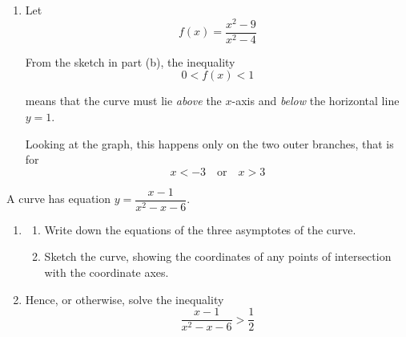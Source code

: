 \documentclass[leqno]{article}
\begin{document}
\begin{enumerate}[
  label=\textbf{\arabic*.},
  leftmargin=*,
  topsep=0pt,
  partopsep=0pt,
  parsep=0pt
]
\begin{djsSolution}
\begin{enumerate}[label=\textbf{(\alph*)}]

  Since the equation depends on $x^2$, the curve is symmetric about the $y$-axis.

  The $x$-intercepts are found by setting $y=0$:
  \[
  \frac{x^2-9}{x^2-4}=0\quad\Longrightarrow\quad x^2-9=0
  \]

  so
  \[
  x=\pm 3
  \]

  giving intercepts $(-3,0)$ and $(3,0)$.

  The $y$-intercept is found by setting $x=0$:
  \[
  y=\frac{0-9}{0-4}=\frac94
  \]

  so the point is
  \[
  \left(0,\frac94\right)
  \]

\item Let
\[
f(x)=\frac{x^2-9}{x^2-4}
\]

From the sketch in part (b), the inequality
\[
0<f(x)<1
\]

means that the curve must lie \emph{above} the $x$-axis and \emph{below} the horizontal line $y=1$.

Looking at the graph, this happens only on the two outer branches, that is for
\[
x<-3 \quad \text{or} \quad x>3
\]
\end{enumerate}
\end{djsSolution}


\newpage

\questionitem

A curve has equation $y=\dfrac{x-1}{x^2-x-6}$. \\
\begin{enumerate}[label=\textbf{(\alph*)}]
  \item
  \begin{enumerate}[label=(\roman*)]
    \item Write down the equations of the three asymptotes of the curve. 
    \item Sketch the curve, showing the coordinates of any points of intersection with the coordinate axes.  \\
  \end{enumerate}
  \item Hence, or otherwise, solve the inequality
  \[
  \frac{x-1}{x^2-x-6}>\frac{1}{2}
  \]
\end{enumerate}


\end{enumerate}
\end{document}
